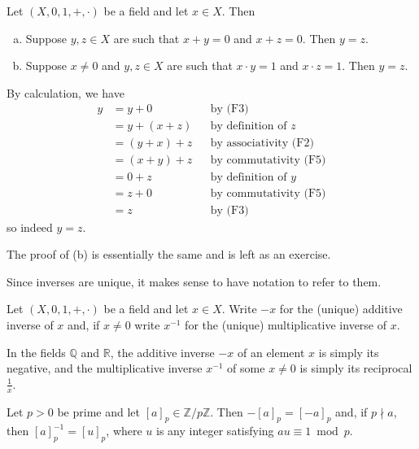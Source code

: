 \begin{proposition}
\label{propInversesInFieldsAreUnique}
Let $(X,0,1,+,{\cdot})$ be a field and let $x \in X$. Then
\begin{enumerate}[(a)]
\item Suppose $y,z \in X$ are such that $x+y=0$ and $x+z=0$. Then $y=z$.
\item Suppose $x \ne 0$ and $y,z \in X$ are such that $x \cdot y = 1$ and $x \cdot z = 1$. Then $y=z$.
\end{enumerate}
\end{proposition}
\begin{cproof}[of (a)]
By calculation, we have
\begin{align*}
y &= y + 0 && \text{by (F3)} \\
&= y + (x+z) && \text{by definition of $z$} \\
&= (y+x)+z && \text{by associativity (F2)} \\
&= (x+y)+z && \text{by commutativity (F5)} \\
&= 0+z && \text{by definition of $y$} \\
&= z+0 && \text{by commutativity (F5)} \\
&= z && \text{by (F3)}
\end{align*}
so indeed $y=z$.

The proof of (b) is essentially the same and is left as an exercise.
\end{cproof}

Since inverses are unique, it makes sense to have notation to refer to them.

\begin{notation}
Let $(X,0,1,+,{\cdot})$ be a field and let $x \in X$. Write $-x$ for the (unique) additive inverse of $x$ and, if $x \ne 0$ write $x^{-1}$ for the (unique) multiplicative inverse of $x$.
\end{notation}

\begin{example}
\label{exQRAreFields}
In the fields $\mathbb{Q}$ and $\mathbb{R}$, the additive inverse $-x$ of an element $x$ is simply its negative, and the multiplicative inverse $x^{-1}$ of some $x \ne 0$ is simply its reciprocal $\frac{1}{x}$.
\end{example}

\begin{example}
Let $p>0$ be prime and let $[a]_p \in \mathbb{Z}/p\mathbb{Z}$. Then $-[a]_p=[-a]_p$ and, if $p \nmid a$, then $[a]_p^{-1} = [u]_p$, where $u$ is any integer satisfying $au \equiv 1 \bmod p$.
\end{example}

